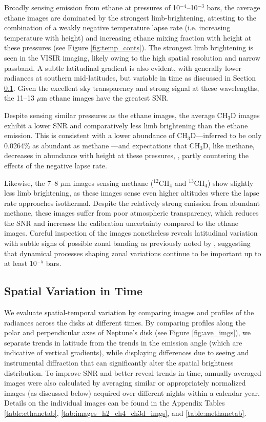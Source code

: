 \documentclass[twocolumn,10pt]{aastex631}
\begin{document}
Broadly sensing emission from ethane at pressures of 10$^{-4}$--10$^{-3}$ bars, the average ethane images are dominated by the strongest limb-brightening, attesting to the combination of a weakly negative temperature lapse rate (i.e. increasing temperature with height) and increasing ethane mixing fraction with height at these pressures (see Figure \ref{fig:temp_conts}). The strongest limb brightening is seen in the VISIR imaging, likely owing to the high spatial resolution and narrow passband.  A subtle latitudinal gradient is also evident, with generally lower radiances at southern mid-latitudes, but variable in time as discussed in Section \ref{sec:spatialvstime}.  Given the excellent sky transparency and strong signal at these wavelengths, the 11--13 $\mu$m ethane images have the greatest SNR. 

Despite sensing similar pressures as the ethane images, the average CH$_3$D images exhibit a lower SNR and comparatively less limb brightening than the ethane emission. This is consistent with a lower abundance of CH$_3$D---inferred to be only 0.0264$\%$ as abundant as methane \citep[with uncertainties exceeding 50\%; \textit{e.g.}, ][]{lecluse1996deuterium,feuchtgruber2013d,fletcher2010neptune}---and expectations that CH$_3$D, like methane, decreases in abundance with height at these pressures, \citep{moses2018seasonal}, partly countering the effects of the negative lapse rate.  

Likewise, the 7--8 $\mu$m images sensing methane ($^{12}$CH$_4$ and $^{13}$CH$_4$) show slightly less limb brightening, as these images sense even higher altitudes where the lapse rate approaches isothermal.   Despite the relatively strong emission from abundant methane, these images suffer from poor atmospheric transparency, which reduces the SNR and increases the calibration uncertainty compared to the ethane images.  Careful inspection of the images nonetheless reveals latitudinal variation with subtle signs of possible zonal banding as previously noted by \citet{sinclair2020spatial}, suggesting that dynamical processes shaping zonal variations continue to be important up to at least 10$^{-5}$ bars.


\subsection{Spatial Variation in Time}\label{sec:spatialvstime}
We evaluate spatial-temporal variation by comparing images and profiles of the radiances across the disks at different times. By comparing profiles along the polar and perpendicular axes of Neptune's disk (see Figure \ref{fig:ave_imgs}), we separate trends in latitude from the trends in the emission angle (which are indicative of vertical gradients), while displaying differences due to seeing and instrumental diffraction that can significantly alter the spatial brightness distribution. To improve SNR and better reveal trends in time, annually averaged images were also calculated by averaging similar or appropriately normalized images (as discussed below) acquired over different nights within a calendar year. Details on the individual images can be found in the Appendix Tables \ref{table:ethanetab}, \ref{tab:images_h2_ch4_ch3d_imgs}, and \ref{table:methanetab}.
\end{document}
